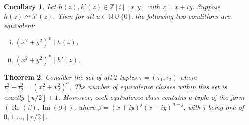 \documentclass[12pt,table]{article}
\newtheorem{theorem}{Theorem}[section]
\newtheorem{corollary}[theorem]{Corollary}
\theoremstyle{definition}
\theoremstyle{remark}
\newcommand{\Nnn}{\mathbb N}
\newcommand{\Zzz}{\mathbb Z}
\newcommand{\divides}{\mid}
\numberwithin{equation}{section}
\DeclareMathOperator{\Imag}{Im}
\DeclareMathOperator{\Real}{Re}
\newcommand{\myfrac}[2]{#1 / #2}
\begin{document}
\begin{corollary}
\label{corollary_equivalence}
Let $ h(z), h'(z) \in \Zzz[i][x,y] $ with $ z = x+ iy $.
Suppose $ h(z) \simeq h'(z) $. Then for all  $ u \in \Nnn \cup \{ 0 \} $,
the following two conditions are
equivalent:
\begin{enumerate}[i.]
\item $ ( x^2 + y^2 ) ^ u \divides h(z) $,
\item $ ( x^2 + y^2 ) ^ u \divides h'(z) $.
\end{enumerate}
\end{corollary}



\begin{theorem}
\label{thm:2D_equivalence}
Consider the set of all $2$-tuples $ \tau = ( \tau_1, \tau_2 )$ where 
$
  \tau_1 ^ 2   +   \tau_2 ^ 2   
= 
\left(  x_1 ^ 2 + x_2 ^ 2  \right) ^ n 
$.
The number of equivalence classes within this set 
is exactly  $ \left\lfloor \myfrac{n}{2} \right\rfloor + 1 $. 
Moreover, each equivalence class contains a tuple
of the form $ ( \Real( \beta ) , \Imag( \beta ) ) $,
where $ \beta = (x + iy)^j (x -  iy)^{n-j} $,
with $ j $
being one of $ 0, 1, \dotsc, \left\lfloor \myfrac{n}{2} \right\rfloor $.
\end{theorem}
\end{document}
